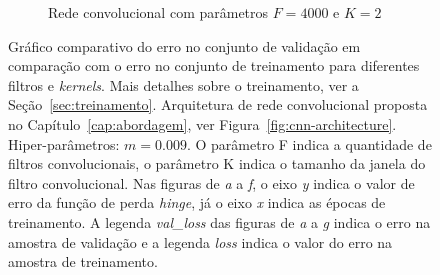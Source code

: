 \begin{figure}[H]
\begin{subfigure}{.5\textwidth}
  \caption{Rede convolucional com parâmetros $F = 4000$ e $K = 2$}
  \label{fig:cnn-4000-k-2-v2}
\end{subfigure}
\caption[Gráfico comparativo do erro no conjunto de validação em comparação com o erro no conjunto de treinamento para diferentes filtros e \textit{kernels}.]{Gráfico comparativo do erro no conjunto de validação em comparação com o erro no conjunto de treinamento para diferentes filtros e \textit{kernels}. Mais detalhes sobre o treinamento, ver a Seção~\ref{sec:treinamento}. Arquitetura de rede convolucional proposta no Capítulo~\ref{cap:abordagem}, ver Figura~\ref{fig:cnn-architecture}. Hiper-parâmetros: $m = 0.009$. O parâmetro F indica a quantidade de filtros convolucionais, o parâmetro K indica o tamanho da janela do filtro convolucional. Nas figuras de \emph{a} a \emph{f}, o eixo \emph{y} indica o valor de erro da função de perda \textit{hinge}, já o eixo \emph{x} indica as épocas de treinamento. A legenda \emph{val\_loss} das figuras de \emph{a} a \emph{g} indica o erro na amostra de validação e a legenda \emph{loss} indica o valor do erro na amostra de treinamento. }
\label{fig:treinamento-cnn-diferentes-kernels}
\end{figure}

